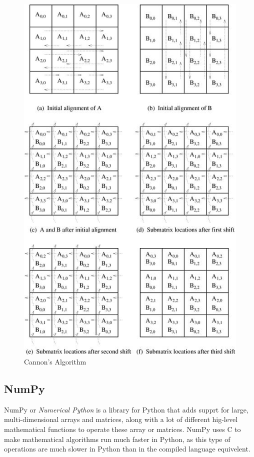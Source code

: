 \documentclass{article}
\begin{document}
\begin{figure}[H]
\begin{center}
\includegraphics[scale=.5]{cannons}
\end{center}
\caption{Cannon's Algorithm}
\end{figure}

\subsection*{NumPy}

NumPy or \textit{Numerical Python} is a library for Python that adds supprt for large, multi-dimensional arrays and matrices, along with a lot of different hig-level mathematical functions to operate these array or matrices. NumPy uses C to make mathematical algorithms run much faster in Python, as this type of operations are much slower in Python than in the compiled language equivelent.
\end{document}
